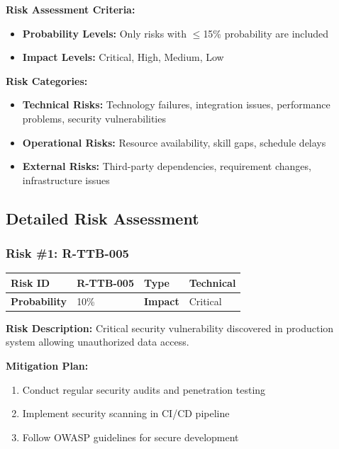 \textbf{Risk Assessment Criteria:}
\begin{itemize}[leftmargin=*]
    \item \textbf{Probability Levels:} Only risks with $\leq$15\% probability are included
    \item \textbf{Impact Levels:} Critical, High, Medium, Low
\end{itemize}

\textbf{Risk Categories:}
\begin{itemize}[leftmargin=*]
    \item \textbf{Technical Risks:} Technology failures, integration issues, performance problems, security vulnerabilities
    \item \textbf{Operational Risks:} Resource availability, skill gaps, schedule delays
    \item \textbf{External Risks:} Third-party dependencies, requirement changes, infrastructure issues
\end{itemize}

\subsection{Detailed Risk Assessment}

\subsubsection{Risk \#1: R-TTB-005}

\begin{table}[h]
\small
\begin{tabular}{|p{3cm}|p{3cm}|p{3cm}|p{3cm}|}
\hline
\textbf{Risk ID} & R-TTB-005 & \textbf{Type} & Technical \\
\hline
\textbf{Probability} & 10\% & \textbf{Impact} & Critical \\
\hline
\end{tabular}
\end{table}

\textbf{Risk Description:} Critical security vulnerability discovered in production system allowing unauthorized data access.

\textbf{Mitigation Plan:}
\begin{enumerate}[leftmargin=*]
    \item Conduct regular security audits and penetration testing
    \item Implement security scanning in CI/CD pipeline
    \item Follow OWASP guidelines for secure development
\end{enumerate}

